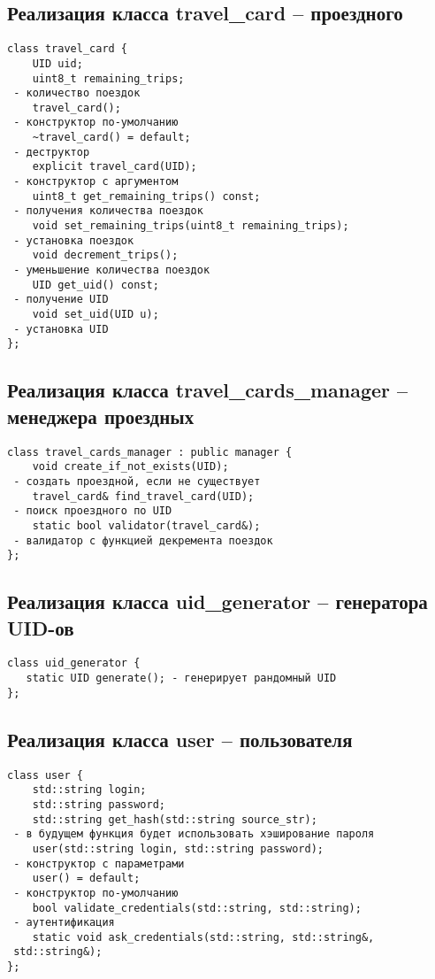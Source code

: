 \subsection{Реализация класса travel\_card -- проездного}
\begin{verbatim}
class travel_card {
	UID uid;
	uint8_t remaining_trips;
 - количество поездок
	travel_card();
 - конструктор по-умолчанию
	~travel_card() = default;
 - деструктор
	explicit travel_card(UID);
 - конструктор с аргументом
	uint8_t get_remaining_trips() const;
 - получения количества поездок
	void set_remaining_trips(uint8_t remaining_trips);
 - установка поездок
	void decrement_trips();
 - уменьшение количества поездок
	UID get_uid() const;
 - получение UID
	void set_uid(UID u);
 - установка UID
};
\end{verbatim}

\subsection{Реализация класса travel\_cards\_manager -- менеджера проездных}
\begin{verbatim}
class travel_cards_manager : public manager {
	void create_if_not_exists(UID);
 - создать проездной, если не существует
	travel_card& find_travel_card(UID);
 - поиск проездного по UID
	static bool validator(travel_card&);
 - валидатор с функцией декремента поездок
};
\end{verbatim}

\subsection{Реализация класса uid\_generator -- генератора UID-ов}
\begin{verbatim}
class uid_generator {
   static UID generate(); - генерирует рандомный UID
};
\end{verbatim}

\subsection{Реализация класса user -- пользователя }
\begin{verbatim}
class user {
	std::string login;
	std::string password;
	std::string get_hash(std::string source_str);
 - в будущем функция будет использовать хэширование пароля
	user(std::string login, std::string password);
 - конструктор с параметрами
	user() = default;
 - конструктор по-умолчанию
	bool validate_credentials(std::string, std::string);
 - аутентификация
	static void ask_credentials(std::string, std::string&,
 std::string&);
};
\end{verbatim}

